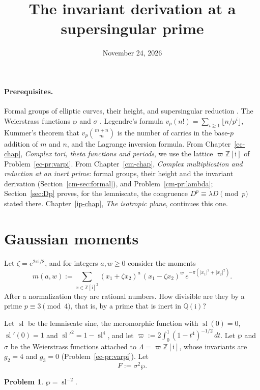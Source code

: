 \documentclass[reqno]{amsart}
\title{The invariant derivation at a supersingular prime}
\author{}
\date{November 24, 2026}
\newcounter{chap}
\theoremstyle{definition}
\newtheorem{problem}{Problem}[section]
\theoremstyle{plain}
\newcommand{\Z}{\mathbb{Z}}
\newcommand{\Q}{\mathbb{Q}}
\newcommand{\ii}{\mathrm{i}}
\newcommand{\sll}{\operatorname{sl}}
\begin{document}
\maketitle
{}\label{chap}

\paragraph{Prerequisites.}
Formal groups of elliptic curves, their height, and supersingular reduction \cite[Ch.~IV and \S\S V.3--V.4]{Si1}.  The Weierstrass functions \(\wp\) and \(\sigma\) \cite[\S I.5]{Si2}.  Legendre's formula \(v_p(n!) = \sum_{i \ge 1} \lfloor n/p^i \rfloor\), Kummer's theorem that \(v_p\binom{m+n}{m}\) is the number of carries in the base-\(p\) addition of \(m\) and \(n\), and the Lagrange inversion formula.  From Chapter~\ref{ec-chap}, \emph{Complex tori, theta functions and periods}, we use the lattice \(\varpi\Z[\ii]\) of Problem~\ref{ec-pr:varpi}.  From Chapter~\ref{cm-chap}, \emph{Complex multiplication and reduction at an inert prime}: formal groups, their height and the invariant derivation (Section~\ref{cm-sec:formal}), and Problem~\ref{cm-pr:lambda}; Section~\ref{sec:Dp} proves, for the lemniscate, the congruence \(D^p \equiv \lambda D \pmod p\) stated there.  Chapter~\ref{ip-chap}, \emph{The isotropic plane}, continues this one.

\section{Gaussian moments}\label{sec:moments}

Let \(\zeta = e^{2\pi\ii/8}\), and for integers \(a, w \ge 0\) consider the moments
\[
  m(a,w) := \sum_{x \in \Z[\ii]^2} (x_1 + \zeta x_2)^a\, (x_1 - \zeta x_2)^w\, e^{-\pi(\lvert x_1 \rvert^2 + \lvert x_2 \rvert^2)} .
\]
After a normalization they are rational numbers.  How divisible are they by a prime \(p \equiv 3 \pmod 4\), that is, by a prime that is inert in \(\Q(\ii)\)?

Let \(\sll\) be the lemniscate sine, the meromorphic function with \(\sll(0) = 0\), \(\sll'(0) = 1\) and \(\sll'^2 = 1 - \sll^4\), and let \(\varpi := 2\int_0^1 (1 - t^4)^{-1/2} \, d t\).  Let \(\wp\) and \(\sigma\) be the Weierstrass functions attached to \(\Lambda = \varpi\Z[\ii]\), whose invariants are \(g_2 = 4\) and \(g_3 = 0\) (Problem~\ref{ec-pr:varpi}).  Let
\[
  F := \sigma^2 \wp .
\]

\begin{problem}\label{pr:wp-sl}
\(\wp = \sll^{-2}\).
\end{problem}
\end{document}
